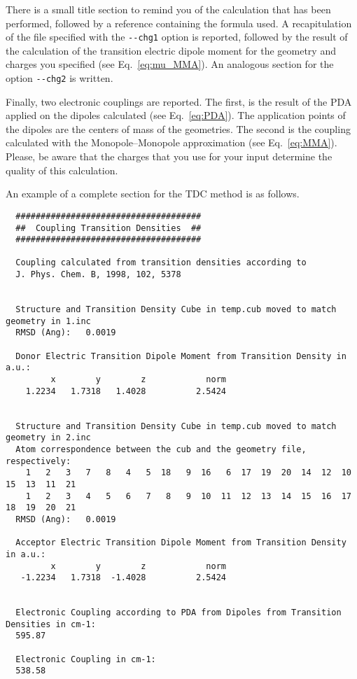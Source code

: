 \documentclass[a4paper]{article}
\begin{document}
There is a small title section to remind you of the calculation that has been performed, followed by a reference containing the formula used. A recapitulation of the file specified with the \verb|--chg1| option is reported, followed by the result of the calculation of the transition electric dipole moment for the geometry and charges you specified (see Eq.~\ref{eq:mu_MMA}). An analogous section for the option \verb|--chg2| is written.

Finally, two electronic couplings are reported. The first, is the result of the PDA applied on the dipoles calculated (see Eq.~\ref{eq:PDA}). The application points of the dipoles are the centers of mass of the geometries. The second is the coupling calculated with the Monopole--Monopole approximation (see Eq.~\ref{eq:MMA}).
Please, be aware that the charges that you use for your input determine the quality of this calculation.

An example of a complete section for the TDC method is as follows.

\begin{verbatim}
  #####################################
  ##  Coupling Transition Densities  ##
  #####################################
  
  Coupling calculated from transition densities according to
  J. Phys. Chem. B, 1998, 102, 5378
  
  
  Structure and Transition Density Cube in temp.cub moved to match geometry in 1.inc
  RMSD (Ang):   0.0019
  
  Donor Electric Transition Dipole Moment from Transition Density in a.u.:
         x        y        z            norm
    1.2234   1.7318   1.4028          2.5424
  
  
  Structure and Transition Density Cube in temp.cub moved to match geometry in 2.inc
  Atom correspondence between the cub and the geometry file, respectively:
    1   2   3   7   8   4   5  18   9  16   6  17  19  20  14  12  10  15  13  11  21 
    1   2   3   4   5   6   7   8   9  10  11  12  13  14  15  16  17  18  19  20  21 
  RMSD (Ang):   0.0019
  
  Acceptor Electric Transition Dipole Moment from Transition Density in a.u.:
         x        y        z            norm
   -1.2234   1.7318  -1.4028          2.5424
  
  
  Electronic Coupling according to PDA from Dipoles from Transition Densities in cm-1:
  595.87    
  
  Electronic Coupling in cm-1:
  538.58    
  
\end{verbatim}
\end{document}
